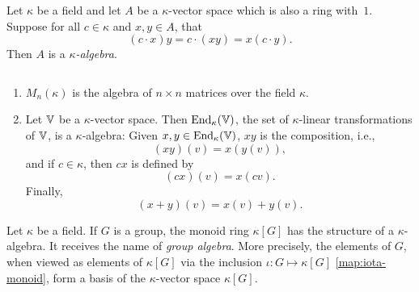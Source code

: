Let\/ $\kappa$ be a field and let\/ $A$ be a\/ $\kappa$-vector space which is
also a ring with\/~$1$. Suppose for all\/ $c\in \kappa$ and\/ $x, y\in A$, that
$$
    (c\cdot x)y = c\cdot(xy) = x(c\cdot y).
$$
Then\/ $A$ is a\/ \textsl{$\kappa$-algebra}.

\begin{xmpls}${}$
\begin{enumerate}[\rm a)]
    \item $M_n(\kappa)$ is the algebra of\/ $n\times n$ matrices over the field\/ $\kappa$.
    
    \item Let\/ $\mathbb V$ be a\/ $\kappa$-vector space. Then\/ ${\operatorname{End}}_\kappa(\mathbb V)$, the set of\/ $\kappa$-linear transformations of\/ $\mathbb V$, is a\/ $\kappa$-algebra: Given\/ $x, y \in {\operatorname{End}}_\kappa(\mathbb V)$, $xy$ is the composition, i.e.,
    $$
        (xy)(v) = x(y(v)),
    $$
    and if\/ $c\in \kappa$, then\/ $cx$ is defined by
    $$
        (cx)(v) = x(cv).
    $$
    Finally,
    $$
        (x + y)(v) = x(v) + y(v).
    $$
\end{enumerate}
\end{xmpls}

\begin{defn}
    Let $\kappa$ be a field. If $G$ is a group, the monoid ring $\kappa[G]$ has the structure of a $\kappa$-algebra. It receives the name of \textsl{group algebra}. More precisely, the elements of $G$, when viewed as elements of $\kappa[G]$ via the inclusion $\iota\colon G\mapsto\kappa[G]$ \eqref{map:iota-monoid}, form a basis of the $\kappa$-vector space $\kappa[G]$.
\end{defn}

